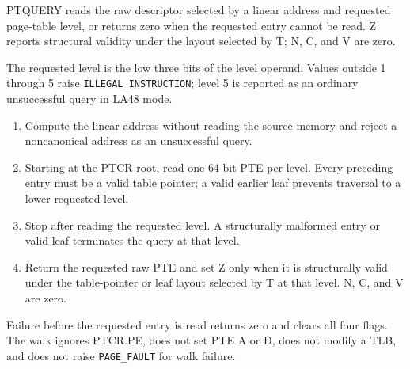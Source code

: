 PTQUERY reads the raw descriptor selected by a linear address and requested page-table level, or returns zero when the requested entry cannot be read. Z reports structural validity under the layout selected by T; N, C, and V are zero.

The requested level is the low three bits of the level operand. Values outside 1 through 5 raise \texttt{ILLEGAL\_INSTRUCTION}; level 5 is reported as an ordinary unsuccessful query in LA48 mode.

\begin{enumerate}
\item Compute the linear address without reading the source memory and reject a noncanonical address as an unsuccessful query.
\item Starting at the PTCR root, read one 64-bit PTE per level. Every preceding entry must be a valid table pointer; a valid earlier leaf prevents traversal to a lower requested level.
\item Stop after reading the requested level. A structurally malformed entry or valid leaf terminates the query at that level.
\item Return the requested raw PTE and set Z only when it is structurally valid under the table-pointer or leaf layout selected by T at that level. N, C, and V are zero.
\end{enumerate}
Failure before the requested entry is read returns zero and clears all four flags. The walk ignores PTCR.PE, does not set PTE A or D, does not modify a TLB, and does not raise \texttt{PAGE\_FAULT} for walk failure.
